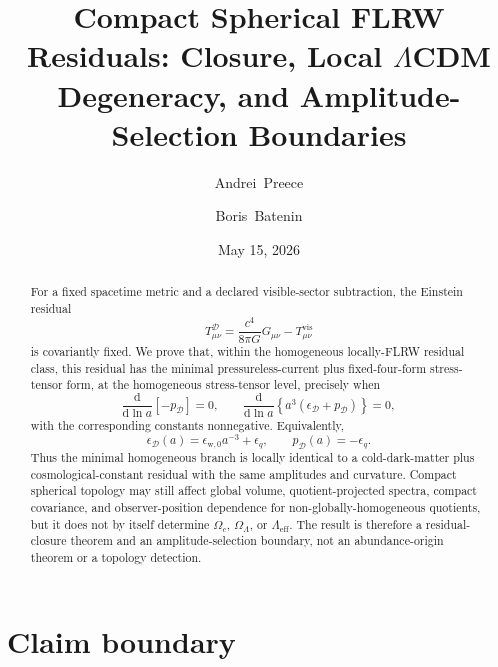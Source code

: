 \documentclass[
  aps,
  prd,
  reprint,
  superscriptaddress,
  floatfix,
  nofootinbib,
  longbibliography
]{revtex4-2}
\theoremstyle{plain}
\theoremstyle{definition}
\theoremstyle{remark}
\newcommand{\dd}{\mathrm d}
\newcommand{\D}{\mathcal D}
\newcommand{\vis}{\mathrm{vis}}
\newcommand{\wind}{\mathrm w}
\newcommand{\eff}{\mathrm{eff}}
\newcommand{\eps}{\epsilon}
\begin{document}
\title{Compact Spherical FLRW Residuals: Closure, Local \texorpdfstring{$\Lambda$}{Lambda}CDM Degeneracy, and Amplitude-Selection Boundaries}

\author{Andrei~Preece}

\author{Boris~Batenin}

\date{May 15, 2026}

\begin{abstract}
For a fixed spacetime metric and a declared visible-sector subtraction, the
Einstein residual
\[
T^\D_{\mu\nu}=\frac{c^4}{8\pi G}G_{\mu\nu}-T^{\vis}_{\mu\nu}
\]
is covariantly fixed.  We prove that, within the homogeneous locally-FLRW
residual class, this residual has the minimal pressureless-current plus
fixed-four-form stress-tensor form, at the homogeneous stress-tensor level,
precisely when
\[
\frac{\dd}{\dd\ln a}[-p_\D]=0,
\qquad
\frac{\dd}{\dd\ln a}\left\{a^3(\eps_\D+p_\D)\right\}=0,
\]
with the corresponding constants nonnegative.  Equivalently,
\[
\eps_\D(a)=\eps_{\wind,0}a^{-3}+\eps_q,
\qquad
p_\D(a)=-\eps_q .
\]
Thus the minimal homogeneous branch is locally identical to a cold-dark-matter
plus cosmological-constant residual with the same amplitudes and curvature.
Compact spherical topology may still affect global volume, quotient-projected
spectra, compact covariance, and observer-position
dependence for non-globally-homogeneous quotients, but it does not by itself determine \(\Omega_c\),
\(\Omega_\Lambda\), or \(\Lambda_{\eff}\).  The result is therefore a
residual-closure theorem and an amplitude-selection boundary, not an
abundance-origin theorem or a topology detection.
\end{abstract}

\maketitle

\section{Claim boundary}
\end{document}
